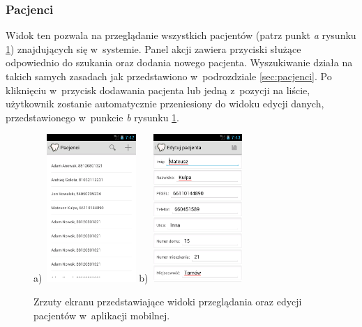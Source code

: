 \documentclass[11pt]{aghdpl}
\begin{document}
\subsubsection{Pacjenci}
\label{sec:pacjenciMobile}

Widok ten pozwala na przeglądanie wszystkich pacjentów (patrz punkt \emph{a} rysunku \ref{fig:pacjenciMobile}) znajdujących się w~systemie. Panel akcji zawiera przyciski służące odpowiednio do szukania oraz dodania nowego pacjenta. Wyszukiwanie działa na takich samych zasadach jak przedstawiono w~podrozdziale \ref{sec:pacjenci}. Po kliknięciu w~przycisk dodawania pacjenta lub jedną z~pozycji na liście, użytkownik zostanie automatycznie przeniesiony do widoku edycji danych, przedstawionego w~punkcie \emph{b} rysunku \ref{fig:pacjenciMobile}.

\begin{figure}[h!]
	\begin{center}
		a)~\includegraphics[width=0.3\textwidth]{pacjenciMobile}
		\hspace{5mm}
		b)~\includegraphics[width=0.3\textwidth]{pacjentMobile}
	\end{center}
	\caption{Zrzuty ekranu przedstawiające widoki przeglądania oraz edycji pacjentów w~aplikacji mobilnej.}
	\label{fig:pacjenciMobile}
\end{figure}
\end{document}
